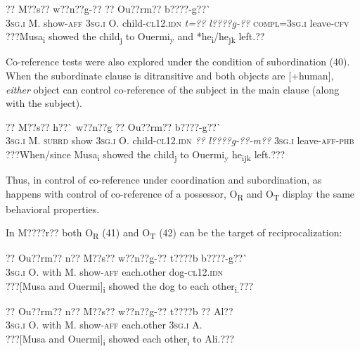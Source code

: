 \documentclass[output=paper]{langsci/langscibook}
\begin{document}
\ea \gll 
??    M??s??  w??n??g-??  ??    Ou??rm??  b????-g??\`{ }        
\\
%
\textsc{3sg.i  }  M.  show-\textsc{aff}  \textsc{3sg.i  }  O.    child-\textsc{cl12.idn}     
\textit{  t=??      l????g-??}
\textsc{  compl=3sg.i}        leave-\textsc{cfv}
\\\glt
???Musa\textsubscript{i}  showed the child\textsubscript{j} to Ouermi\textsubscript{y} and *he\textsubscript{i}/he\textsubscript{jk} left.??
\z

Co-reference tests were also explored under the condition of subordination (40). When the subordinate clause is ditransitive and both objects are [+human], \textit{either} object can control co-reference of the subject in the main clause (along with the subject).


\ea \gll 
\label{bkm:Ref424332520}??    M??s??  h??\`{ }    w??n??g  ??    Ou??rm??      b????-g??\`{ }    
\\
%
\textsc{3sg.i  }  M.  \textsc{subrd}    show  \textsc{3sg.i  }  O.        child-\textsc{cl12.idn}
\textsc{  }\textit{??     l????g-??-m??}
  \textsc{3sg.i  }  leave-\textsc{aff-phb}
\\\glt
???When/since Musa\textsubscript{i }showed the child\textsubscript{j} to Ouermi\textsubscript{y} he\textsubscript{ijk} left.???
\z

Thus, in control of co-reference under coordination and subordination, as happens with control of co-reference of a possessor, O\textsubscript{R} and O\textsubscript{T} display the same behavioral properties. 


In M????r?? both O\textsubscript{R} (41) and O\textsubscript{T} (42) can be the target of reciprocalization:


\ea \gll 
\label{bkm:Ref424287194}??    Ou??rm??  n??  M??s??  w??n??g-??  t????b    b????-g??\`{ }
\\
%
\textsc{3sg.i  }  O.    with  M.  show-\textsc{aff}  each.other  dog-\textsc{cl12.idn}
\\\glt
???[Musa and Ouermi]\textsubscript{i} showed the dog to each other\textsubscript{i.}???
\z


\ea \gll 
\label{bkm:Ref424287203}??    Ou??rm??  n??  M??s??  w??n??g-??  t????b    ??    Al??
\\
%
\textsc{3sg.i    }O.    with  M.  show-\textsc{aff}  each.other  \textsc{3sg.i  }   A.
\\\glt
???[Musa and Ouermi]\textsubscript{i} showed each other\textsubscript{i} to Ali.???
\z
\end{document}
